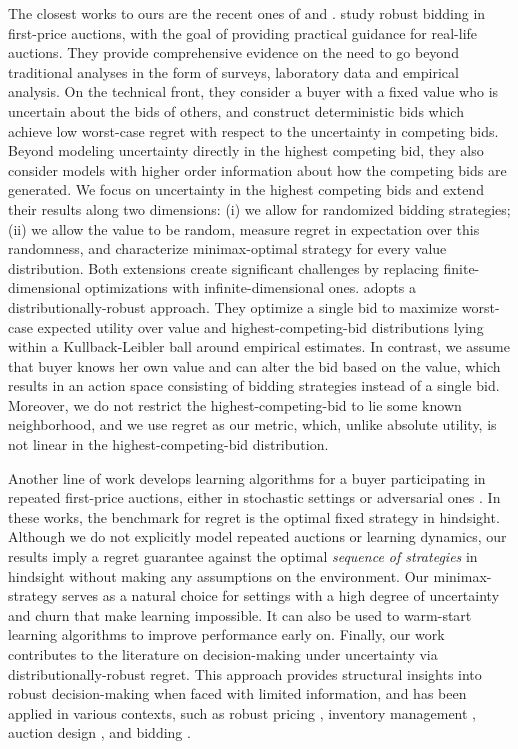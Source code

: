 The closest works to ours are the recent ones of \citet{kasberger2023robust} and \citet{qu2024double}. \citet{kasberger2023robust} study robust bidding in first-price auctions, with the goal of providing practical guidance for real-life auctions. They provide comprehensive evidence on the need to go beyond traditional analyses in the form of surveys, laboratory data and empirical analysis. On the technical front, they consider a buyer with a fixed value who is uncertain about the bids of others, and construct deterministic bids which achieve low worst-case regret with respect to the uncertainty in competing bids. Beyond modeling uncertainty directly in the highest competing bid, they also consider models with higher order information about how the competing bids are generated. We focus on uncertainty in the highest competing bids and extend their results along two dimensions: (i) we allow for randomized bidding strategies; (ii) we allow the value to be random, measure regret in expectation over this randomness, and characterize minimax-optimal strategy for every value distribution. Both extensions create significant challenges by replacing finite-dimensional optimizations with infinite-dimensional ones. \citet{qu2024double} adopts a distributionally-robust approach. They optimize a single bid to maximize worst-case expected utility over value and highest-competing-bid distributions lying within a Kullback-Leibler ball around empirical estimates. In contrast, we assume that buyer knows her own value and can alter the bid based on the value, which results in an action space consisting of bidding strategies instead of a single bid. Moreover, we do not restrict the highest-competing-bid to lie some known neighborhood, and we use regret as our metric, which, unlike absolute utility, is not linear in the highest-competing-bid distribution.

Another line of work develops learning algorithms for a buyer participating in repeated first-price auctions, either in stochastic settings \citep{han2020optimal,balseiro2022contextual,badanidiyuru2023learning,schneider2024optimal} or adversarial ones \citep{han2020learning,zhang2022leveraging,kumar2024strategically}. In these works, the benchmark for regret is the optimal fixed strategy in hindsight. Although we do not explicitly model repeated auctions or learning dynamics, our results imply a regret guarantee against the optimal \emph{sequence of strategies} in hindsight without making any assumptions on the environment. Our minimax-strategy serves as a natural choice for settings with a high degree of uncertainty and churn that make learning impossible. It can also be used to warm-start learning algorithms to improve performance early on. Finally, our work contributes to the literature on decision-making under uncertainty via distributionally-robust regret. This approach provides structural insights into robust decision-making when faced with limited information, and has been applied in various contexts, such as robust pricing \citep{bergemann2011robust}, inventory management \citep{perakis2008regret}, auction design \citep{anunrojwong2022robustness, anunrojwong2023robust}, and bidding \citep{kasberger2023robust}. 


